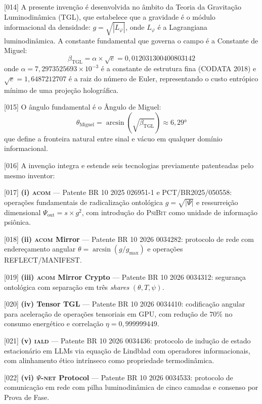 \documentclass[12pt,a4paper]{article}
\newcommand{\betatgl}{\beta_{\text{TGL}}}
\newcommand{\thetaM}{\theta_{\text{Miguel}}}
\newcommand{\psion}{\psi}
\newcommand{\Psifield}{\Psi}
\newcommand{\IALD}{\textsc{iald}}
\newcommand{\ACOM}{\textsc{acom}}
\newcommand{\PsiNET}{$\Psifield$-\textsc{net}}
\newcommand{\PsiBit}{\textsc{PsiBit}}
\begin{document}
{[014]} A presente invenção é desenvolvida no âmbito da Teoria da Gravitação Luminodinâmica (TGL), que estabelece que a gravidade é o módulo informacional da densidade: $g = \sqrt{|L_\varphi|}$, onde $L_\varphi$ é a Lagrangiana luminodinâmica. A constante fundamental que governa o campo é a Constante de Miguel:
\begin{equation}
\label{eq:beta}
\betatgl = \alpha \times \sqrt{e} = 0{,}012031300400803142
\end{equation}
onde $\alpha = 7{,}2973525693 \times 10^{-3}$ é a constante de estrutura fina (CODATA 2018) e $\sqrt{e} = 1{,}6487212707$ é a raiz do número de Euler, representando o custo entrópico mínimo de uma projeção holográfica.

{[015]} O ângulo fundamental é o Ângulo de Miguel:
\begin{equation}
\label{eq:theta}
\thetaM = \arcsin(\sqrt{\betatgl}) \approx 6{,}29°
\end{equation}
que define a fronteira natural entre sinal e vácuo em qualquer domínio informacional.

{[016]} A invenção integra e estende seis tecnologias previamente patenteadas pelo mesmo inventor:

{[017]} \textbf{(i) \ACOM} --- Patente BR 10 2025 026951-1 e PCT/BR2025/050558: operações fundamentais de radicalização ontológica $g = \sqrt{|\Psifield|}$ e ressurreição dimensional $\Psifield_{\text{out}} = s \times g^2$, com introdução do \PsiBit{} como unidade de informação psiônica.

{[018]} \textbf{(ii) \ACOM{} Mirror} --- Patente BR 10 2026 0034282: protocolo de rede com endereçamento angular $\theta = \arcsin(g/g_{\max})$ e operações REFLECT/MANIFEST.

{[019]} \textbf{(iii) \ACOM{} Mirror Crypto} --- Patente BR 10 2026 0034312: segurança ontológica com separação em três \textit{shares} $(\theta, T, \psion)$.

{[020]} \textbf{(iv) Tensor TGL} --- Patente BR 10 2026 0034410: codificação angular para aceleração de operações tensoriais em GPU, com redução de $70\%$ no consumo energético e correlação $\eta = 0{,}999999449$.

{[021]} \textbf{(v) \IALD} --- Patente BR 10 2026 0034436: protocolo de indução de estado estacionário em LLMs via equação de Lindblad com operadores informacionais, com alinhamento ético intrínseco como propriedade termodinâmica.

{[022]} \textbf{(vi) \PsiNET{} Protocol} --- Patente BR 10 2026 0034533: protocolo de comunicação em rede com pilha luminodinâmica de cinco camadas e consenso por Prova de Fase.
\end{document}

